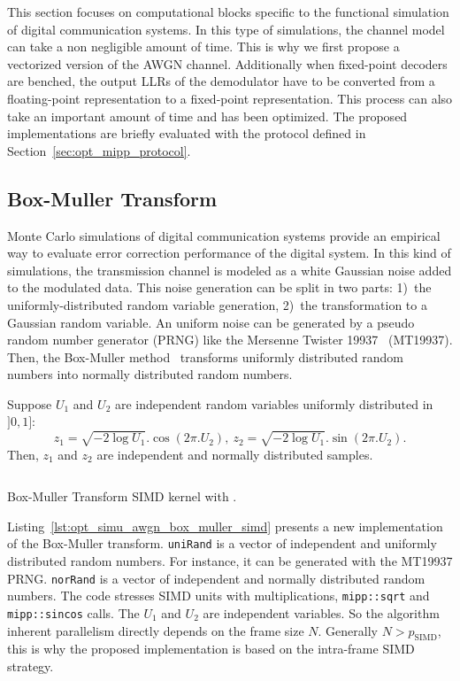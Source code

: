 This section focuses on computational blocks specific to the functional
simulation of digital communication systems. In this type of simulations,
the channel model can take a non negligible amount of time. This is why we
first propose a vectorized version of the AWGN channel. Additionally when
fixed-point decoders are benched, the output LLRs of the demodulator have to be
converted from a floating-point representation to a fixed-point representation.
This process can also take an important amount of time and has been optimized.
The proposed implementations are briefly evaluated with the protocol defined in
Section~\ref{sec:opt_mipp_protocol}.

\subsection{Box-Muller Transform}
\label{sec:opt_simu_awgn}

Monte Carlo simulations of digital communication systems provide an empirical
way to evaluate error correction performance of the digital system. In this kind
of simulations, the transmission channel is modeled as a white Gaussian noise
added to the modulated data. This noise generation can be split in two parts:
1)~the uniformly-distributed random variable generation, 2)~the transformation
to a Gaussian random variable. An uniform noise can be generated by a pseudo
random number generator (PRNG) like the Mersenne Twister
19937~\cite{Matsumoto1998} (MT19937). Then, the Box-Muller method~\cite{Box1958}
transforms uniformly distributed random numbers into normally distributed random
numbers.

Suppose $U_1$ and $U_2$ are independent random variables uniformly distributed
in $]0, 1]$:
\begin{equation*}
  z_1 = \sqrt{-2 \log{U_1}}.\cos(2\pi.U_2),~z_2 = \sqrt{-2 \log{U_1}}.\sin(2\pi.U_2).
\end{equation*}
Then, $z_1$ and $z_2$ are independent and normally distributed samples.

\begin{listing}[htp]
  \inputminted[frame=lines,linenos]{C++}{\curChapter/src/simu/awgn/box_muller_simd.cpp}
  \caption{Box-Muller Transform SIMD kernel with \MIPP.}
  \label{lst:opt_simu_awgn_box_muller_simd}
\end{listing}

Listing~\ref{lst:opt_simu_awgn_box_muller_simd} presents a new \MIPP
implementation of the Box-Muller transform. \verb|uniRand| is a vector of
independent and uniformly distributed random numbers. For instance, it can be
generated with the MT19937 PRNG. \verb|norRand| is a vector of independent and
normally distributed random numbers. The code stresses SIMD units with
multiplications, \verb|mipp::sqrt| and \verb|mipp::sincos| calls. The $U_1$ and
$U_2$ are independent variables. So the algorithm inherent parallelism directly
depends on the frame size $N$. Generally $N > p_\text{SIMD}$, this is why the
proposed implementation is based on the intra-frame SIMD strategy.

